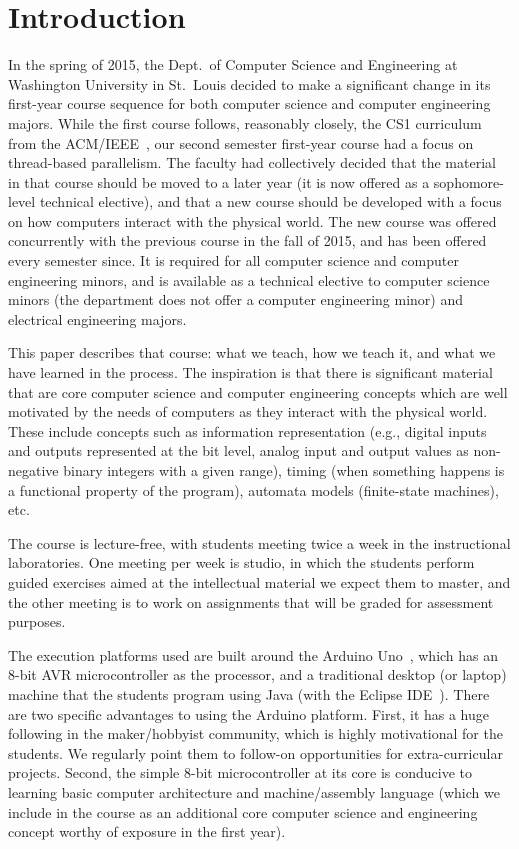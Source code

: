 \section{Introduction}
\label{sec:intro}

In the spring of 2015, the Dept.~of Computer Science and Engineering at
Washington University in St.~Louis decided to make a significant change
in its first-year course sequence for both computer science and
computer engineering majors.  While the first course follows, reasonably
closely, the CS1 curriculum from the ACM/IEEE~\cite{cs13}, our second semester
first-year course had a focus on thread-based parallelism.  The faculty
had collectively decided that the material in that course should be moved
to a later year (it is now offered as a sophomore-level technical elective),
and that a new course should be developed with a focus on how computers
interact with the physical world.
The new course was offered concurrently with the previous course in the
fall of 2015, and has been offered every semester since.
It is required for all computer science and computer engineering minors,
and is available as a technical elective to computer science minors (the
department does not offer a computer engineering minor) and electrical
engineering majors.

This paper describes that course: what we teach, how we teach it, and
what we have learned in the process.
The inspiration is that there is significant material that are core
computer science and computer engineering concepts which are well motivated
by the needs of computers as they interact with the physical world.
These include concepts such as information representation (e.g., digital inputs
and outputs represented at the bit level, analog input and output values as
non-negative binary integers with a given range),
timing (when something happens is a functional property of the program),
automata models (finite-state machines), etc.

The course is lecture-free, with students meeting twice a week in the
instructional laboratories.  One meeting per week is studio, in which the
students perform guided exercises aimed at the intellectual material we
expect them to master, and the other meeting is to work on assignments
that will be graded for assessment purposes.

The execution platforms used are built around the Arduino Uno~\cite{arduino},
which has an 8-bit AVR microcontroller as the processor,
and a traditional desktop (or laptop) machine that the
students program using Java (with the Eclipse IDE~\cite{eclipse}).
There are two specific advantages to using the Arduino platform.
First, it has a huge following in the maker/hobbyist community, which
is highly motivational for the students.  We regularly point them to
follow-on opportunities for extra-curricular projects.
Second, the simple 8-bit microcontroller at its core is conducive to
learning basic computer architecture and machine/assembly language
(which we include in the course as an additional core computer
science and engineering concept worthy of exposure in the first year).

